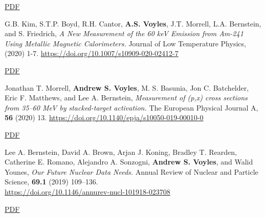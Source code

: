 \begin{bibsection}
\ifshort \vspace{0.1cm} \href{https://avoyles.github.io/papers/Basunia2020_BR.pdf}{\underline{PDF}} \else  \fi 





\item G.B. Kim, S.T.P. Boyd, R.H. Cantor, \textbf{A.S. Voyles}, J.T. Morrell, L.A. Bernstein, and S. Friedrich, \emph{A New Measurement of the 60 keV Emission from Am-241 Using Metallic Magnetic Calorimeters.} Journal of Low Temperature Physics,  (2020) 1-7. \url{https://doi.org/10.1007/s10909-020-02412-7} 

\ifshort \vspace{0.1cm} \href{https://avoyles.github.io/papers/Kim2020_Calorimeter.pdf}{\underline{PDF}} \else  \fi 




\item Jonathan T. Morrell, \textbf{Andrew S. Voyles}, M. S. Basunia, Jon C. Batchelder, Eric F. Matthews, and Lee A. Bernstein, \emph{Measurement of (p,x) cross sections from 35--60 MeV by stacked-target activation.} The European Physical Journal A, \textbf{56} (2020) 13. \url{https://doi.org/10.1140/epja/s10050-019-00010-0} 

\ifshort \vspace{0.1cm} \href{https://avoyles.github.io/papers/Morrell2020_LaCe.pdf}{\underline{PDF}} \else  \fi 


\item Lee A. Bernstein,  David A. Brown,  Arjan J. Koning, Bradley T. Rearden,  Catherine E. Romano, Alejandro A. Sonzogni,  \textbf{Andrew S. Voyles}, and Walid Younes, \emph{Our Future Nuclear Data Needs.} Annual Review of Nuclear and Particle Science, \textbf{69.1} (2019) 109--136.
\\ \url{https://doi.org/10.1146/annurev-nucl-101918-023708}


\ifshort \vspace{0.1cm} \href{https://avoyles.github.io/papers/Bernstein2019_NuclearData.pdf}{\underline{PDF}} \else  \fi 




\end{bibsection}
